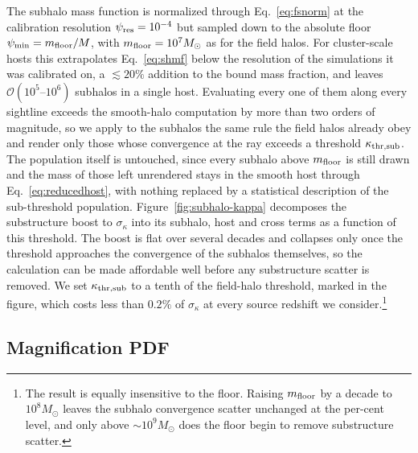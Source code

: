 \documentclass[aps,prd,10pt,nofootinbib,twocolumn,superscriptaddress,floatfix,notitlepage]{revtex4-1}
\newcommand{\Msun}{M_\odot}
\newcommand{\B}[1]{{\color{blue} #1}}
\begin{document}
\B{The subhalo mass function is normalized through Eq.~\eqref{eq:fsnorm} at the
calibration resolution $\psi_{\rm res} = 10^{-4}$ but sampled down to the absolute floor
$\psi_{\rm min} = m_{\rm floor}/M$, with $m_{\rm floor} = 10^7\Msun$ as for the field
halos. For cluster-scale hosts this extrapolates Eq.~\eqref{eq:shmf} below the resolution
of the simulations it was calibrated on, a $\lesssim 20\%$ addition to the bound mass
fraction, and leaves $\mathcal{O}(10^5\text{--}10^6)$ subhalos in a single host.
Evaluating every one of them along every sightline exceeds the smooth-halo computation by
more than two orders of magnitude, so we apply to the subhalos the same rule the field
halos already obey and render only those whose convergence at the ray exceeds a threshold
$\kappa_{\rm thr,sub}$. The population itself is untouched, since every subhalo above
$m_{\rm floor}$ is still drawn and the mass of those left unrendered stays in the smooth
host through Eq.~\eqref{eq:reducedhost}, with nothing replaced by a statistical
description of the sub-threshold population. Figure~\ref{fig:subhalo-kappa} decomposes the
substructure boost to $\sigma_\kappa$ into its subhalo, host and cross terms as a function
of this threshold. The boost is flat over several decades and collapses only once the
threshold approaches the convergence of the subhalos themselves, so the calculation can be
made affordable well before any substructure scatter is removed. We set
$\kappa_{\rm thr,sub}$ to a tenth of the field-halo threshold, marked in the figure, which
costs less than $0.2\%$ of $\sigma_\kappa$ at every source redshift we
consider.\footnote{The result is equally insensitive to the floor. Raising $m_{\rm floor}$
by a decade to $10^8\Msun$ leaves the subhalo convergence scatter unchanged at the
per-cent level, and only above $\sim\!10^9\Msun$ does the floor begin to remove
substructure scatter.}}

\subsection{Magnification PDF}
\label{sec:pdf}
\end{document}
